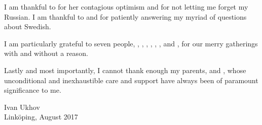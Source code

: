 I am thankful to  for her contagious optimism and
for not letting me forget my Russian. I am thankful to 
and  for patiently answering my myriad of questions about
Swedish.

I am particularly grateful to seven people, ,
, , ,
, , and
, for our merry gatherings with and without a
reason.

Lastly and most importantly, I cannot thank enough my parents,
 and , whose unconditional and
inexhaustible care and support have always been of paramount significance to me.

\vspace{4em}
\hfill
\begin{minipage}{0.35\textwidth}
Ivan Ukhov\\
Linköping, August 2017
\end{minipage}

